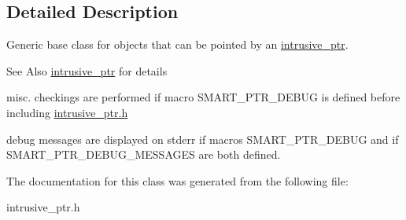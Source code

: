 \subsection{Detailed Description}
Generic base class for objects that can be pointed by an \hyperlink{classintrusive__ptr}{intrusive\-\_\-ptr}.
\begin{DoxyItemize}
\item \begin{DoxySeeAlso}{See Also}
\hyperlink{classintrusive__ptr}{intrusive\-\_\-ptr} for details
\end{DoxySeeAlso}

\item misc. checkings are performed if macro S\-M\-A\-R\-T\-\_\-\-P\-T\-R\-\_\-\-D\-E\-B\-U\-G is defined before including \hyperlink{intrusive__ptr_8h_source}{intrusive\-\_\-ptr.\-h}
\item debug messages are displayed on stderr if macros S\-M\-A\-R\-T\-\_\-\-P\-T\-R\-\_\-\-D\-E\-B\-U\-G and if S\-M\-A\-R\-T\-\_\-\-P\-T\-R\-\_\-\-D\-E\-B\-U\-G\-\_\-\-M\-E\-S\-S\-A\-G\-E\-S are both defined. 
\end{DoxyItemize}

The documentation for this class was generated from the following file\-:\begin{DoxyCompactItemize}
\item 
intrusive\-\_\-ptr.\-h\end{DoxyCompactItemize}

